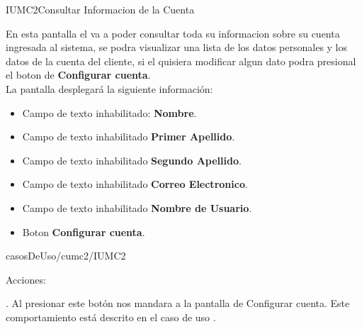 

\begin{IU}{IUMC2}{Consultar Informacion de la Cuenta}{En esta pantalla el  va a poder consultar toda su informacion sobre su cuenta ingresada al sistema, se podra visualizar una lista de los datos personales y los datos de la cuenta del cliente, si el  quisiera modificar algun dato podra presional el boton de \textbf{Configurar cuenta}.\\
		
La pantalla desplegará la siguiente información:
\begin{itemize}
	\item Campo de texto inhabilitado: \textbf{Nombre}.
	\item Campo de texto inhabilitado \textbf{Primer Apellido}.
	\item Campo de texto inhabilitado \textbf{Segundo Apellido}.
	\item Campo de texto inhabilitado \textbf{Correo Electronico}.
	\item Campo de texto inhabilitado \textbf{Nombre de Usuario}.
	\item Boton \textbf{Configurar cuenta}.
\end{itemize}}{casosDeUso/cumc2/IUMC2}
	

	\item[Acciones:]\hspace{1pt}
	\begin{Citemize}
		\item {}. Al presionar este botón nos mandara a la pantalla de Configurar cuenta. Este comportamiento está descrito en el caso de uso .
	\end{Citemize}
\end{IU}
